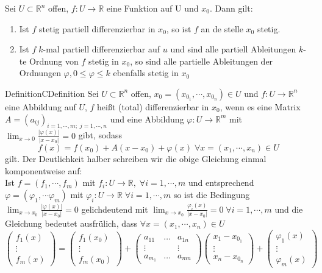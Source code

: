 Sei $ U \subset \mathbb{R}^n  $ offen, $ f:U\to \mathbb{R}  $ eine Funktion auf U und $ x_0 $. Dann gilt:
\begin{enumerate}[label=\alph*)]
	\item Ist $ f $ stetig partiell differenzierbar in $ x_0 $, so ist $ f $ an de stelle $ x_0 $ stetig.
	\item Ist $ f \; k$-mal partiell differenzierbar auf $ u $ und sind alle partiell Ableitungen 
		$ k $-te Ordnung von $ f $ stetig in $ x_0 $, so sind alle partielle Ableitungen der Ordnungen 
		$ \varphi , 0 \leq \varphi \leq k $ ebenfalls stetig in $ x_0 $  
\end{enumerate}

\begin{ibox}[]{Definition}{CDefinition}
    Sei $ U \subset \mathbb{R}^n  $ offen, $ x_0 = \left( x_{0_{1}}, \cdots , x_{0_{n}} \right) \in  U $ und 
	$ f: U \to \mathbb{R}^{n}  $ eine Abbildung auf $ U $, $ f $ heißt (total) differenzierbar in $ x_0 $, wenn es eine 
	Matrix $ A = \left( a_{ij} \right)_{i = 1, \cdots,m ; \; j = 1, \cdots, n}  $ und eine Abbildung 
	$ \varphi : U \to \mathbb{R}^m   $ mit $ \lim_{x \to 0} \frac{|\varphi(x)|}{\left| x - x_0 \right| }  = 0 $ gibt,
	sodass 
	$$ f(x) = f(x_0) + A(x-x_0) + \varphi (x) \; \forall x = \left( x_1, \cdots, x_{n} \right) \in U $$
	gilt. Der Deutlichkeit halber schreiben wir die obige Gleichung einmal komponentweise auf:
	\\
	Ist $ f = \left( f_1, \cdots, f_{m} \right)  $ mit $ f_{i}: U \to \mathbb{R}, \; \forall i = 1, \cdots, m $
	und entsprechend $ \varphi = \left( \varphi_{1}, \cdots \varphi_{m} \right)  $ mit $ \varphi_{i}: U \to \mathbb{R} 
	\; \forall i = 1, \cdots, m$ so ist die Bedingung $ \lim_{x \to x_0} \frac{| \varphi (x)|}{|x - x_0|} = 0 $ 
	gelichdeutend mit $ \lim_{x \to x_0} \frac{\varphi_i (x)}{|x - x_0|} = 0 \; \forall i = 1, \cdots, m $ und 
	die Gleichung bedeutet ausfrülich, dass  $ \forall x = (x_1, \cdots, x_{n}) \in  U	 $ 	
	$$ 
		\begin{pmatrix}
			f_1(x) \\ \vdots \\ f_{m}(x) 
		\end{pmatrix} = \begin{pmatrix}
			f_1(x_{0}) \\ \vdots \\ f_{m}(x_0)  
		\end{pmatrix}+
		\begin{pmatrix}
			a_{11} &\dots &a_{1n}\\
			\vdots & & \vdots \\
			a_{m_1} & \dots	& a_{mn}
		\end{pmatrix}
		\begin{pmatrix}
			x_1 - x_{0_{1}}\\
			\vdots \\
			x_{n} - x_{0_{n}}
		\end{pmatrix} + 
		\begin{pmatrix}
			\varphi_1(x) \\
			\vdots \\
			\varphi_{m}(x)
		\end{pmatrix}
	$$
\end{ibox}
%
